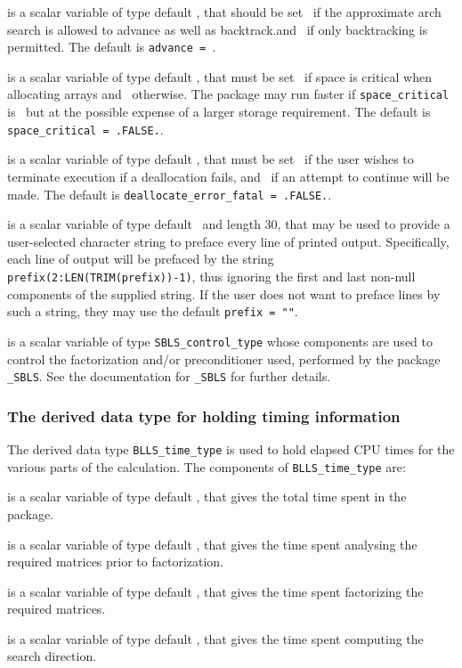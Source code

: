 \documentclass{galahad}
\newcommand{\packagename}{BLLS}
\begin{document}
\begin{description}
 is a scalar variable of type default \logical, that should
be set \true\ if the approximate arch search is allowed to advance as
well as backtrack.and \false\ if only backtracking is permitted.
The default is {\tt advance = \true}.

 is a scalar variable of type default \logical,
that must be set \true\ if space is critical when allocating arrays
and  \false\ otherwise. The package may run faster if
{\tt space\_critical} is \false\ but at the possible expense of a larger
storage requirement. The default is {\tt space\_critical = .FALSE.}.

 is a scalar variable of type default \logical,
that must be set \true\ if the user wishes to terminate execution if
a deallocation  fails, and \false\ if an attempt to continue
will be made. The default is {\tt deallocate\_error\_fatal = .FALSE.}.

 is a scalar variable of type default \character\
and length 30, that may be used to provide a user-selected
character string to preface every line of printed output.
Specifically, each line of output will be prefaced by the string
{\tt prefix(2:LEN(TRIM(prefix))-1)},
thus ignoring the first and last non-null components of the
supplied string. If the user does not want to preface lines by such
a string, they may use the default {\tt prefix = ""}.

 is a scalar variable of type
{\tt SBLS\_control\_type} %
whose components are used to control the factorization and/or
preconditioner used,
performed by the package
{\tt \libraryname\_SBLS}.
See the documentation for {\tt \libraryname\_SBLS} for further details.

\end{description}


\subsubsection{The derived data type for holding timing
 information}\label{typetime}
The derived data type
{\tt \packagename\_time\_type}
is used to hold elapsed CPU times for the various parts of the calculation.
The components of
{\tt \packagename\_time\_type}
are:
\begin{description}
 is a scalar variable of type default \real, that gives
 the total time spent in the package.

 is a scalar variable of type default \real, that gives
 the time spent analysing the required matrices prior to factorization.

 is a scalar variable of type default \real, that gives
 the time spent factorizing the required matrices.

 is a scalar variable of type default \real, that gives
 the time spent computing the search direction.

\end{description}
\end{document}
